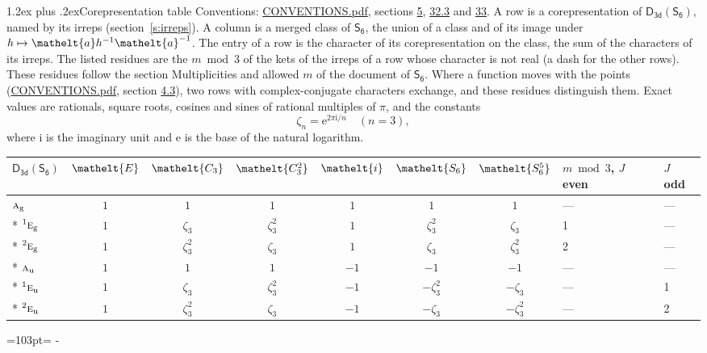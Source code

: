 \documentclass[10pt,a4paper]{article}
\makeatletter
\renewcommand\section{\@startsection{section}{1}{\z@}{-3ex plus -1ex minus -.2ex}%
  {1.2ex plus .2ex}{\normalfont\large\sffamily\bfseries\color{parttitle}}}
\newcommand{\needspace}[1]{\par\penalty-100\begingroup\dimen0=#1\relax\dimen2=\pagegoal
  \advance\dimen2-\pagetotal\ifdim\dimen0>\dimen2\relax\ifdim\dimen2>0pt\vfil\break\fi\fi
  \endgroup}
\numberwithin{equation}{section}
\newcommand{\eltfont}[1]{{\let\sigma\eltsigma\mathelt{#1}}}
\newcommand{\grp}[1]{\mathsf{#1}}
\newcommand{\irr}[1]{\text{\normalfont\scshape #1}}
\newcommand{\conjpair}[1]{{}^{#1}}
\newcommand{\cls}[1]{\eltfont{#1}}
\newcommand{\elt}[1]{\eltfont{#1}}
\newcommand{\ptag}[1]{\mathrm{#1}}
\newcommand{\iunit}{\mathrm{i}}
\newcommand{\expe}{\mathrm{e}}
\newcommand{\rootunity}[1]{\zeta_{#1}}
\makeatother
\begin{document}
\section{Corepresentation table}\label{s:character_table}
Conventions: \href{../../CONVENTIONS.pdf}{CONVENTIONS.pdf}, sections \href{../../../rotation/CONVENTIONS.pdf\#conv.5}{5}, \href{../../CONVENTIONS.pdf\#conv.32.3}{32.3} and \href{../../CONVENTIONS.pdf\#conv.33}{33}.
A row is a corepresentation of $\grp{D_{3d}}(\grp{S_{6}})$, named by its irreps (section~\ref{s:irreps}). A column is a merged class of $\grp{S_{6}}$, the union of a class and of its image under $h \mapsto \elt{a} h^{-1} \elt{a}^{-1}$. The entry of a row is the character of its corepresentation on the class, the sum of the characters of its irreps.
\leavevmode\label{n:head.parity}The listed residues are the $m \bmod 3$ of the kets of the irreps of a row whose character is not real (a dash for the other rows). These residues follow the section Multiplicities and allowed $m$ of the document of \href{../../../rotation/data/pdf/S6.pdf}{$\grp{S_{6}}$}. Where a function moves with the points (\href{../../CONVENTIONS.pdf}{CONVENTIONS.pdf}, section \href{../../../rotation/CONVENTIONS.pdf\#conv.4.3}{4.3}), two rows with complex-conjugate characters exchange, and these residues distinguish them.
\leavevmode\label{n:constant.root}\label{n:index.root.order}Exact values are rationals, square roots, cosines and sines of rational multiples of $\pi$, and the constants
\begin{equation}\label{e:constants}\rootunity{n} = \expe^{2\pi\iunit/n}\quad(n = 3),\end{equation}
where $\iunit$ is the imaginary unit and $\expe$ is the base of the natural logarithm.
{\small\setlength{\tabcolsep}{4pt}\begin{longtable}{@{}lccccccll@{}}\toprule
$\grp{D_{3d}}(\grp{S_{6}})$ & $\cls{E}$ & $\cls{C_{3}}$ & $\cls{C_{3}^{2}}$ & $\cls{i}$ & $\cls{S_{6}}$ & $\cls{S_{6}^{5}}$ & $m \bmod 3$, $J$ even & $J$ odd\\\midrule\endhead
\bottomrule\endfoot\endlastfoot
$\irr{a}_{\ptag{g}}$ & $1$ & $1$ & $1$ & $1$ & $1$ & $1$ & --- & ---\\*
$\conjpair{1}\irr{e}_{\ptag{g}}$ & $1$ & $\rootunity{3}$ & $\rootunity{3}^{2}$ & $1$ & $\rootunity{3}^{2}$ & $\rootunity{3}$ & 1 & ---\\*
$\conjpair{2}\irr{e}_{\ptag{g}}$ & $1$ & $\rootunity{3}^{2}$ & $\rootunity{3}$ & $1$ & $\rootunity{3}$ & $\rootunity{3}^{2}$ & 2 & ---\\*
$\irr{a}_{\ptag{u}}$ & $1$ & $1$ & $1$ & $-1$ & $-1$ & $-1$ & --- & ---\\*
$\conjpair{1}\irr{e}_{\ptag{u}}$ & $1$ & $\rootunity{3}$ & $\rootunity{3}^{2}$ & $-1$ & $-\rootunity{3}^{2}$ & $-\rootunity{3}$ & --- & 1\\*
$\conjpair{2}\irr{e}_{\ptag{u}}$ & $1$ & $\rootunity{3}^{2}$ & $\rootunity{3}$ & $-1$ & $-\rootunity{3}$ & $-\rootunity{3}^{2}$ & --- & 2\\
\bottomrule\end{longtable}}
\needspace{103pt}
\end{document}
